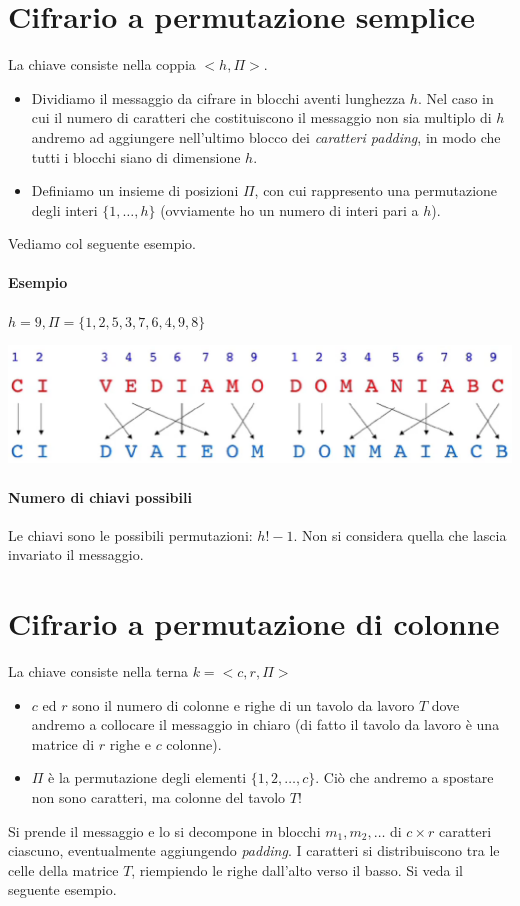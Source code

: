 \section{Cifrario a permutazione semplice} 
La chiave consiste nella coppia $<h, \Pi>$. 
\begin{itemize}
	\item Dividiamo il messaggio da cifrare in blocchi aventi lunghezza $h$. Nel caso in cui il numero di caratteri che costituiscono il messaggio non sia multiplo di $h$ andremo ad aggiungere nell'ultimo blocco dei \emph{caratteri padding}, in modo che tutti i blocchi siano di dimensione $h$.
	\item Definiamo un insieme di posizioni $\Pi$, con cui rappresento una permutazione degli interi $\{1,\dots,h\}$ (ovviamente ho un numero di interi pari a $h$).
\end{itemize}
Vediamo col seguente esempio.
\paragraph{Esempio} $h = 9, \Pi=\{1, 2, 5, 3, 7, 6, 4, 9, 8\}$
\begin{center}
	\includegraphics[scale=.5]{images/10.PNG}
\end{center}
\paragraph{Numero di chiavi possibili} Le chiavi sono le possibili permutazioni: $h!-1$. Non si considera quella che lascia invariato il messaggio.
\section{Cifrario a permutazione di colonne}
La chiave consiste nella terna $k=<c, r, \Pi>$
\begin{itemize}
	\item $c$ ed $r$ sono il numero di colonne e righe di un tavolo da lavoro $T$ dove andremo a collocare il messaggio in chiaro (di fatto il tavolo da lavoro è una matrice di $r$ righe e $c$ colonne).
	\item $\Pi$ è la permutazione degli elementi $\{1, 2, \dots, c\}$. Ciò che andremo a spostare non sono caratteri, ma colonne del tavolo $T$!
\end{itemize}
Si prende il messaggio e lo si decompone in blocchi $m_1, m_2, \dots$ di $c \times r$ caratteri ciascuno, eventualmente aggiungendo \textit{padding}. I caratteri si distribuiscono tra le celle della matrice $T$, riempiendo le righe dall'alto verso il basso. Si veda il seguente esempio.

